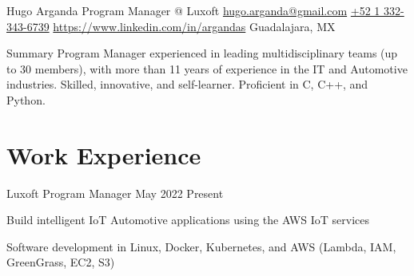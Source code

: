 \documentclass{resume} %
\begin{document}

\customheader
    {Hugo Arganda}
    {Program Manager @ Luxoft}
    {\href{mailto:hugo.arganda@gmail.com}{hugo.arganda@gmail.com}}
    {\href{https://wa.me/5213323436739}{+52 1 332-343-6739}}
    {\href{https://www.linkedin.com/in/argandas}{https://www.linkedin.com/in/argandas}}
    {Guadalajara, MX}



\summary
{Summary}
    {Program Manager experienced in leading multidisciplinary teams (up to 30 members), with more than 11 years of experience in the IT and Automotive industries. Skilled, innovative, and self-learner. Proficient in C, C++, and Python.}



\section{Work Experience}


\job
    {Luxoft}
    {Program Manager}
    {May 2022}
    {Present}
    {}
    {
    \begin{itemize-bullets}
    \item{Build intelligent IoT Automotive applications using the AWS IoT services}
    \item{Software development in Linux, Docker, Kubernetes, and AWS (Lambda, IAM, GreenGrass, EC2, S3)}
    \end{itemize-bullets}
    }
\end{document}
